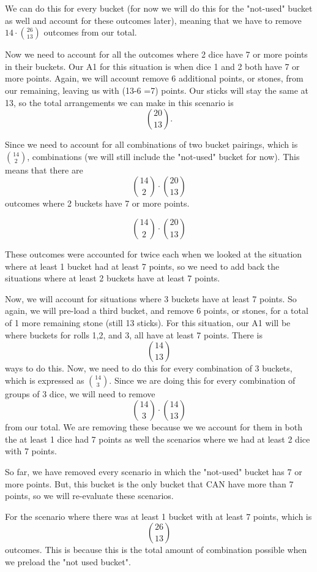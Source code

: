 \documentclass[11pt]{article}
\begin{document}
We can do this for every bucket (for now we will do this for the "not-used" bucket as well and account for these outcomes later), meaning that we have to remove  
$14 \cdot \binom{26}{13}$ outcomes from our total. 

Now we need to account for all the outcomes where 2 dice have 7 or more points in their buckets. Our A1 for this situation is when dice 1 and 2 both have 7 or more points. Again, we will account remove 6 additional points, or stones, from our remaining, leaving us with (13-6 =7) points. Our sticks will stay the same at 13, so the total arrangements we can make in this scenario is  
$$\binom{20}{13}.$$

Since we need to account for all combinations of two bucket pairings, which is  
$\binom{14}{2}$,  
combinations (we will still include the "not-used" bucket for now). This means that there are  
$$\binom{14}{2} \cdot \binom{20}{13}$$
outcomes where 2 buckets have 7 or more points.  

$$\binom{14}{2} \cdot \binom{20}{13}$$

These outcomes were accounted for twice each when we looked at the situation where at least 1 bucket had at least 7 points, so we need to add back the situations where at least 2 buckets have at least 7 points.

Now, we will account for situations where 3 buckets have at least 7 points. So again, we will pre-load a third bucket, and remove 6 points, or stones, for a total of 1 more remaining stone (still 13 sticks). For this situation, our A1 will be where buckets for rolls 1,2, and 3, all have at least 7 points. There is  
$$\binom{14}{13}$$
ways to do this. Now, we need to do this for every combination of 3 buckets, which is expressed as  
$\binom{14}{3}$. Since we are doing this for every combination of groups of 3 dice, we will need to remove  
$$\binom{14}{3} \cdot \binom{14}{13}$$
from our total. We are removing these because we we account for them in both the at least 1 dice had 7 points as well the scenarios where we had at least 2 dice with 7 points. 

So far, we have removed every scenario in which the "not-used" bucket has 7 or more points. But, this bucket is the only bucket that CAN have more than 7 points, so we will re-evaluate these scenarios. 

For the scenario where there was at least 1 bucket with at least 7 points, which is  
$$\binom{26}{13}$$
outcomes. This is because this is the total amount of combination possible when we preload the "not used bucket".
\end{document}
